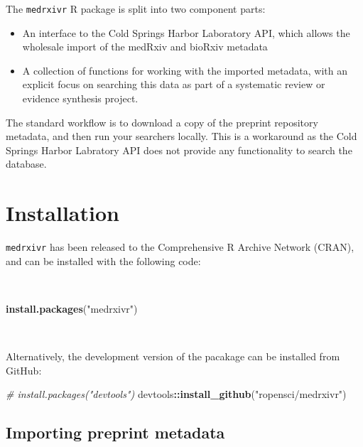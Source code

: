 \documentclass[a4paper, twoside]{templates/ociamthesis}
\providecommand{\tightlist}{%
  \setlength{\itemsep}{0pt}\setlength{\parskip}{0pt}}
\newenvironment{Shaded}{\begin{snugshade}}{\end{snugshade}}
\newcommand{\CommentTok}[1]{\textcolor[rgb]{0.56,0.35,0.01}{\textit{#1}}}
\newcommand{\KeywordTok}[1]{\textcolor[rgb]{0.13,0.29,0.53}{\textbf{#1}}}
\newcommand{\NormalTok}[1]{#1}
\newcommand{\OperatorTok}[1]{\textcolor[rgb]{0.81,0.36,0.00}{\textbf{#1}}}
\newcommand{\StringTok}[1]{\textcolor[rgb]{0.31,0.60,0.02}{#1}}
\renewenvironment{Shaded}
{
  \vspace{4pt}%
  \begin{snugshade}%
}{%
  \end{snugshade}%
  \vspace{4pt}%
}
\begin{document}
The \texttt{medrxivr} R package is split into two component parts:

\begin{itemize}
\tightlist
\item
  An interface to the Cold Springs Harbor Laboratory API, which allows the wholesale import of the medRxiv and bioRxiv metadata
\item
  A collection of functions for working with the imported metadata, with an explicit focus on searching this data as part of a systematic review or evidence synthesis project.
\end{itemize}

The standard workflow is to download a copy of the preprint repository metadata, and then run your searchers locally. This is a workaround as the Cold Springs Harbor Labratory API does not provide any functionality to search the database.

\hypertarget{installation}{%
\section{Installation}\label{installation}}

\texttt{medrxivr} has been released to the Comprehensive R Archive Network (CRAN), and can be installed with the following code:

~

\begin{Shaded}
\begin{Highlighting}[]
\KeywordTok{install.packages}\NormalTok{(}\StringTok{"medrxivr"}\NormalTok{)}
\end{Highlighting}
\end{Shaded}

~

Alternatively, the development version of the pacakage can be installed from GitHub:

\begin{Shaded}
\begin{Highlighting}[]
\CommentTok{# install.packages("devtools") }
\NormalTok{devtools}\OperatorTok{::}\KeywordTok{install_github}\NormalTok{(}\StringTok{"ropensci/medrxivr"}\NormalTok{)}
\end{Highlighting}
\end{Shaded}

\hypertarget{importing-preprint-metadata}{%
\subsection{Importing preprint metadata}\label{importing-preprint-metadata}}
\end{document}
